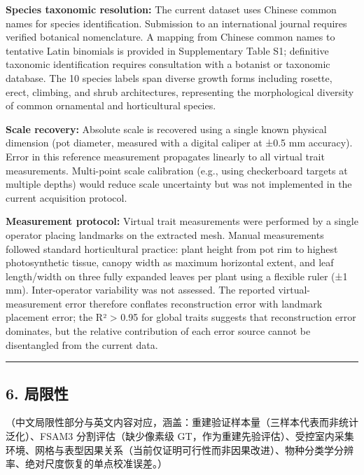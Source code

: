 \documentclass[11pt,a4paper]{article}
\begin{document}
\textbf{Species taxonomic resolution:} The current dataset uses Chinese
common names for species identification. Submission to an international
journal requires verified botanical nomenclature. A mapping from Chinese
common names to tentative Latin binomials is provided in Supplementary
Table S1; definitive taxonomic identification requires consultation with
a botanist or taxonomic database. The 10 species labels span diverse
growth forms including rosette, erect, climbing, and shrub
architectures, representing the morphological diversity of common
ornamental and horticultural species.

\textbf{Scale recovery:} Absolute scale is recovered using a single
known physical dimension (pot diameter, measured with a digital caliper
at ±0.5 mm accuracy). Error in this reference measurement propagates
linearly to all virtual trait measurements. Multi-point scale
calibration (e.g., using checkerboard targets at multiple depths) would
reduce scale uncertainty but was not implemented in the current
acquisition protocol.

\textbf{Measurement protocol:} Virtual trait measurements were performed
by a single operator placing landmarks on the extracted mesh. Manual
measurements followed standard horticultural practice: plant height from
pot rim to highest photosynthetic tissue, canopy width as maximum
horizontal extent, and leaf length/width on three fully expanded leaves
per plant using a flexible ruler (±1 mm). Inter-operator variability was
not assessed. The reported virtual-measurement error therefore conflates
reconstruction error with landmark placement error; the R²
\textgreater{} 0.95 for global traits suggests that reconstruction error
dominates, but the relative contribution of each error source cannot be
disentangled from the current data.

\begin{center}\rule{0.5\linewidth}{0.5pt}\end{center}

\subsection{6. 局限性}\label{ux5c40ux9650ux6027}

（中文局限性部分与英文内容对应，涵盖：重建验证样本量（三样本代表而非统计泛化）、FSAM3
分割评估（缺少像素级
GT，作为重建先验评估）、受控室内采集环境、网格与表型因果关系（当前仅证明可行性而非因果改进）、物种分类学分辨率、绝对尺度恢复的单点校准误差。）
\end{document}
